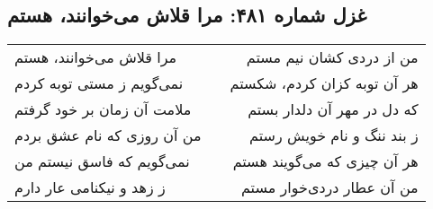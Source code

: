 \begin{center}
\section*{غزل شماره ۴۸۱: مرا قلاش می‌خوانند، هستم}
\label{sec:481}
\begin{longtable}{l p{0.5cm} r}
مرا قلاش می‌خوانند، هستم
&&
من از دردی کشان نیم مستم
\\
نمی‌گویم ز مستی توبه کردم
&&
هر آن توبه کزان کردم، شکستم
\\
ملامت آن زمان بر خود گرفتم
&&
که دل در مهر آن دلدار بستم
\\
من آن روزی که نام عشق بردم
&&
ز بند ننگ و نام خویش رستم
\\
نمی‌گویم که فاسق نیستم من
&&
هر آن چیزی که می‌گویند هستم
\\
ز زهد و نیکنامی عار دارم
&&
من آن عطار دردی‌خوار مستم
\\
\end{longtable}
\end{center}
